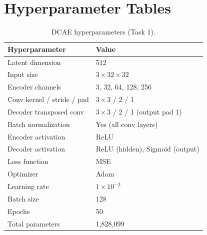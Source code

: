 \documentclass[12pt]{article}
\begin{document}
\appendix
\section{Hyperparameter Tables}

\begin{table}[h]
    \centering
    \caption{DCAE hyperparameters (Task 1).}
    \begin{tabular}{ll}
        \toprule
        \textbf{Hyperparameter} & \textbf{Value} \\
        \midrule
        Latent dimension          & 512 \\
        Input size                & $3 \times 32 \times 32$ \\
        Encoder channels          & 3, 32, 64, 128, 256 \\
        Conv kernel / stride / pad & $3\times3$ / 2 / 1 \\
        Decoder transposed conv   & $3\times3$ / 2 / 1 (output pad 1) \\
        Batch normalization       & Yes (all conv layers) \\
        Encoder activation        & ReLU \\
        Decoder activation        & ReLU (hidden), Sigmoid (output) \\
        Loss function             & MSE \\
        Optimizer                 & Adam \\
        Learning rate             & $1\times10^{-3}$ \\
        Batch size                & 128 \\
        Epochs                    & 50 \\
        Total parameters          & 1,828,099 \\
        \bottomrule
    \end{tabular}
\end{table}
\end{document}

